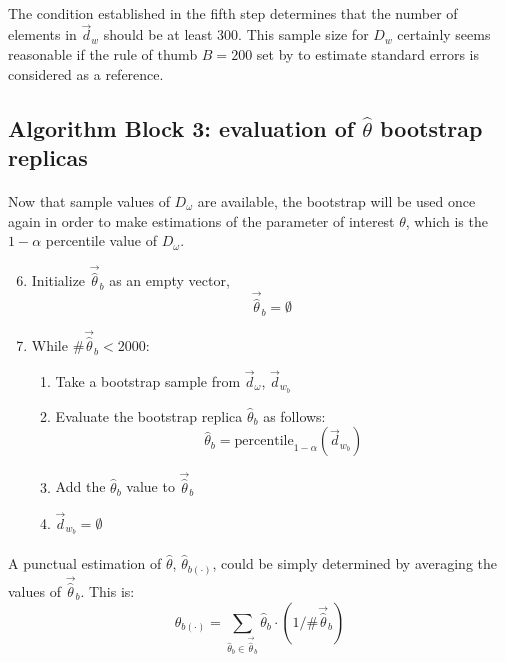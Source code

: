 \documentclass[letterpaper]{article}
\begin{document}
\paragraph{}
The condition established in the fifth step determines that the number of elements in $\vec{d}_w$ should be at least 300. This sample size for $D_w$ certainly seems reasonable if the rule of thumb $B=200$ set by \cite{efron1994introduction} to estimate standard errors is considered as a reference.

\FloatBarrier

\subsection*{Algorithm Block 3: evaluation of $\hat{\theta}$ bootstrap replicas}
\paragraph{}
Now that sample values of $D_\omega$ are available, the bootstrap will be used once again in order to make estimations of the parameter of interest $\theta$, which is the $1-\alpha$ percentile value of $D_\omega$.


\begin{enumerate}
	\setcounter{enumi}{5}
	\item Initialize $\vec{\hat{\theta}}_b$ as an empty vector,
		\begin{equation}
			\vec{\hat{\theta}}_b = \emptyset
		\end{equation}
	\item While $\#\vec{\hat{\theta}}_b<2000$:
		\begin{enumerate}
			\item Take a bootstrap sample from $\vec{d}_\omega$, $\vec{d}_{w_b}$
			\item Evaluate the bootstrap replica $\hat{\theta}_b$ as follows:
				\begin{equation}
					\hat{\theta}_b=\mathrm{percentile}_{1-\alpha}(\vec{d}_{w_b})
				\end{equation}
			\item Add the $\hat{\theta}_b$ value to $\vec{\hat{\theta}}_b$
			\item $\vec{d}_{w_b}=\emptyset$
		\end{enumerate}
\end{enumerate}

\paragraph{}
A punctual estimation of $\hat{\theta}$, $\hat{\theta}_{b{(\cdot)}}$,  could be simply determined by averaging the values of $\vec{\hat{\theta}}_b$. This is:
\begin{equation}
    \hat{\theta}_{b(\cdot)}=\sum_{\hat{\theta}_b\in\vec{\hat{\theta}}_b}\hat{\theta}_b\cdot\left(1/\#\vec{\hat{\theta}}_b\right)
\end{equation}
\end{document}
